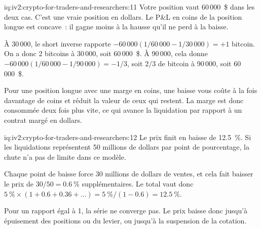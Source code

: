 \begin{solution}{iq:iv2:crypto-for-traders-and-researchers:11}
Votre position vaut 60\,000~\$ dans les deux cas. C'est une vraie position en dollars. Le P\&L en coins de la position longue est concave~: il gagne moins à la hausse qu'il ne perd à la baisse.

À 30\,000, le short inverse rapporte $-60\,000(1/60\,000 - 1/30\,000) = +1$ bitcoin. On a donc 2 bitcoins à 30\,000, soit 60\,000~\$. À 90\,000, cela donne $-60\,000(1/60\,000 - 1/90\,000) = -1/3$, soit $2/3$ de bitcoin à 90\,000, soit 60\,000~\$.

Pour une position longue avec une marge en coins, une baisse vous coûte à la fois davantage de coins et réduit la valeur de ceux qui restent. La marge est donc consommée deux fois plus vite, ce qui avance la liquidation par rapport à un contrat margé en dollars.

\end{solution}

\begin{solution}{iq:iv2:crypto-for-traders-and-researchers:12}
Le prix finit en baisse de 12.5~\%. Si les liquidations représentent 50 millions de dollars par point de pourcentage, la chute n'a pas de limite dans ce modèle.

Chaque point de baisse force 30 millions de dollars de ventes, et cela fait baisser le prix de $30/50 = 0.6~\%$ supplémentaires. Le total vaut donc $5~\% \times (1 + 0.6 + 0.36 + \dots) = 5~\%/(1 - 0.6) = 12.5~\%$.

Pour un rapport égal à 1, la série ne converge pas. Le prix baisse donc jusqu'à épuisement des positions ou du levier, ou jusqu'à la suspension de la cotation.

\end{solution}

